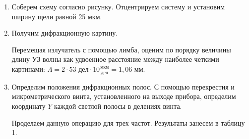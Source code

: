 \documentclass[a4paper,12pt]{article} %
\begin{document}
	\begin{enumerate}
		\item Соберем схему согласно рисунку. Отцентрируем систему и установим ширину щели равной 25 мкм.
		
		\item Получим дифракционную картину.
		
		Перемещая излучатель с помощью лимба, оценим по порядку величины длину УЗ волны как удвоенное расстояние между наиболее четкими картинами: $\Lambda = 2 \cdot 53 \text{ дел}\cdot 10\frac{\text{мкм}}{\text{дел}} = 1,06$ мм.
		
		\item Определим положения дифракционных полос. С помощью перекрестия и микрометрического винта, установленного на выходе прибора, определим координату $Y$ каждой светлой полосы в делениях винта. 
		
		Проделаем данную операцию для трех частот. Результаты занесем в таблицу 1.
		

\end{enumerate}
\end{document}

